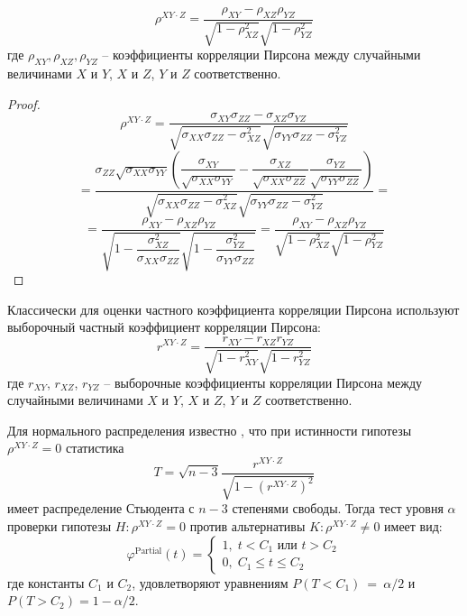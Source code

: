 \begin{lemma}\label{partial_formula2}
    $$
    \rho^{XY \cdot Z}=\dfrac{\rho_{XY}-\rho_{XZ}\rho_{YZ}}{\sqrt{1-\rho_{XZ}^2}\sqrt{1-\rho_{YZ}^2}}
    $$
    где $\rho_{XY}, \rho_{XZ}, \rho_{YZ}$ -- коэффициенты корреляции Пирсона
    между случайными величинами $X$ и $Y$, $X$ и $Z$, $Y$ и $Z$
    соответственно.
\end{lemma}
\begin{proof}
    $$
    \rho^{XY \cdot Z}=\dfrac{\sigma_{XY} \sigma_{ZZ} - \sigma_{XZ} \sigma_{YZ}}{\sqrt{\sigma_{XX}\sigma_{ZZ}-
    \sigma_{XZ}^2}\sqrt{\sigma_{YY}\sigma_{ZZ}-\sigma_{YZ}^2}}
    $$
    $$
    =\dfrac{\sigma_{ZZ}\sqrt{\sigma_{XX}\sigma_{YY}}
    \left(\dfrac{\sigma_{XY}}{\sqrt{\sigma_{XX}\sigma_{YY}}} 
    - \dfrac{\sigma_{XZ}}{\sqrt{\sigma_{XX}\sigma_{ZZ}}} \dfrac{\sigma_{YZ}}{\sqrt{\sigma_{YY}\sigma_{ZZ}}}\right)}
    {\sqrt{\sigma_{XX}\sigma_{ZZ}-
    \sigma_{XZ}^2}\sqrt{\sigma_{YY}\sigma_{ZZ}-\sigma_{YZ}^2}}=
    $$
    $$
    =\dfrac{\rho_{XY}-\rho_{XZ}\rho_{YZ}}{\sqrt{1-\dfrac{\sigma_{XZ}^2}{\sigma_{XX}\sigma_{ZZ}}}
    \sqrt{1-\dfrac{\sigma_{YZ}^2}{\sigma_{YY}\sigma_{ZZ}}}}
    =\dfrac{\rho_{XY}-\rho_{XZ}\rho_{YZ}}{\sqrt{1-\rho_{XZ}^2}\sqrt{1-\rho_{YZ}^2}}
    $$
\end{proof}
Классически для оценки частного коэффициента корреляции Пирсона используют выборочный частный коэффициент корреляции Пирсона:
$$r^{XY\cdot Z}=\dfrac{r_{XY}-r_{XZ}r_{YZ}}{\sqrt{1-r_{XY}^2}\sqrt{1-r_{YZ}^2}}$$
где $r_{XY}$, $r_{XZ}$, $r_{YZ}$ -- выборочные коэффициенты корреляции Пирсона
между случайными величинами $X$ и $Y$, $X$ и $Z$, $Y$ и $Z$
соответственно. 

Для нормального распределения известно \cite{Anderson2003}, что при истинности гипотезы $\rho^{XY \cdot Z}=0$ статистика
$$
T=\sqrt{n-3} \dfrac{r^{XY \cdot Z}}{\sqrt{1-(r^{XY \cdot Z})^2}}
$$
имеет распределение Стьюдента с $n-3$ степенями свободы.
Тогда тест уровня $\alpha$ проверки гипотезы $H: \rho^{XY\cdot Z}=0$ против альтернативы $K: \rho^{XY\cdot Z} \neq 0$ имеет вид:
$$
\varphi^{\text{Partial}}(t) = \begin{cases}
    1, \; t<C_1 \text{ или } t>C_2 \\ 
    0, \; C_1 \leq t \leq C_2
\end{cases}
$$
где константы $C_1$ и $C_2$, удовлетворяют уравнениям $P(T<C_1)~=~\alpha/2$ и $P(T>C_2)=1-\alpha/2$.

